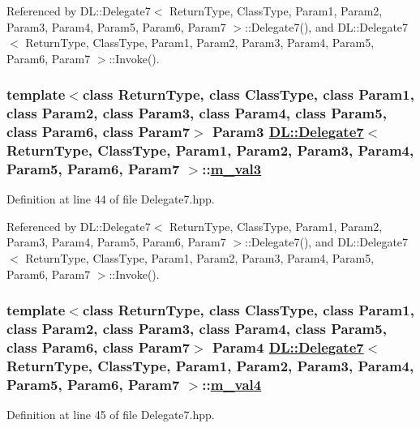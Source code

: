 Referenced by DL::Delegate7$<$ Return\-Type, Class\-Type, Param1, Param2, Param3, Param4, Param5, Param6, Param7 $>$::Delegate7(), and DL::Delegate7$<$ Return\-Type, Class\-Type, Param1, Param2, Param3, Param4, Param5, Param6, Param7 $>$::Invoke().\hypertarget{classDL_1_1Delegate7_r4}{
\subsubsection[m\_\-val3]{\setlength{\rightskip}{0pt plus 5cm}template$<$class Return\-Type, class Class\-Type, class Param1, class Param2, class Param3, class Param4, class Param5, class Param6, class Param7$>$ Param3 \hyperlink{classDL_1_1Delegate7}{DL::Delegate7}$<$ Return\-Type, Class\-Type, Param1, Param2, Param3, Param4, Param5, Param6, Param7 $>$::\hyperlink{classDL_1_1Delegate7_r4}{m\_\-val3}}}
\label{classDL_1_1Delegate7_r4}




Definition at line 44 of file Delegate7.hpp.

Referenced by DL::Delegate7$<$ Return\-Type, Class\-Type, Param1, Param2, Param3, Param4, Param5, Param6, Param7 $>$::Delegate7(), and DL::Delegate7$<$ Return\-Type, Class\-Type, Param1, Param2, Param3, Param4, Param5, Param6, Param7 $>$::Invoke().\hypertarget{classDL_1_1Delegate7_r5}{
\subsubsection[m\_\-val4]{\setlength{\rightskip}{0pt plus 5cm}template$<$class Return\-Type, class Class\-Type, class Param1, class Param2, class Param3, class Param4, class Param5, class Param6, class Param7$>$ Param4 \hyperlink{classDL_1_1Delegate7}{DL::Delegate7}$<$ Return\-Type, Class\-Type, Param1, Param2, Param3, Param4, Param5, Param6, Param7 $>$::\hyperlink{classDL_1_1Delegate7_r5}{m\_\-val4}}}
\label{classDL_1_1Delegate7_r5}




Definition at line 45 of file Delegate7.hpp.

